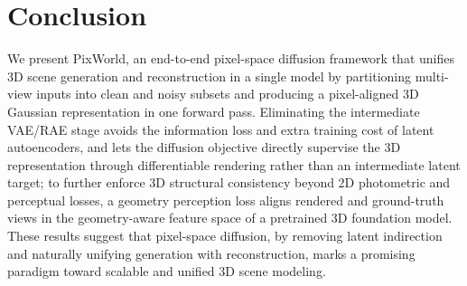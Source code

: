 \section{Conclusion}
We present PixWorld, an end-to-end pixel-space diffusion framework that unifies 3D scene generation and reconstruction in a single model by partitioning multi-view inputs into clean and noisy subsets and producing a pixel-aligned 3D Gaussian representation in one forward pass. Eliminating the intermediate VAE/RAE stage avoids the information loss and extra training cost of latent autoencoders, and lets the diffusion objective directly supervise the 3D representation through differentiable rendering rather than an intermediate latent target; to further enforce 3D structural consistency beyond 2D photometric and perceptual losses, a geometry perception loss aligns rendered and ground-truth views in the geometry-aware feature space of a pretrained 3D foundation model. These results suggest that pixel-space diffusion, by removing latent indirection and naturally unifying generation with reconstruction, marks a promising paradigm toward scalable and unified 3D scene modeling.